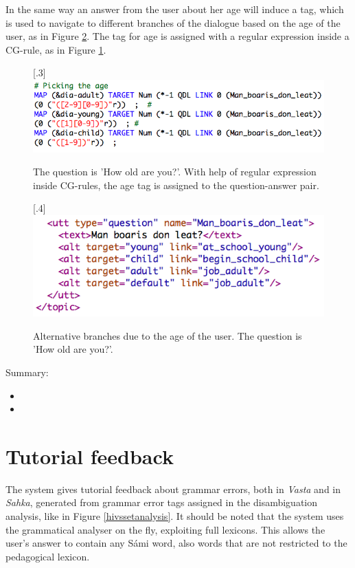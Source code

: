 \documentclass[11pt]{article}
\begin{document}
In the same way an answer from the user about her age will induce a tag, which is used to navigate to different branches of the dialogue based on the age of the user, as in Figure \ref{agebranches}. The tag for age is assigned with a regular expression inside a CG-rule, as in Figure \ref{agerule}.




\begin{figure}[htbp]
\begin{center}
\scalebox{.3}[.3]{\includegraphics{presentation/img/pickingage_colours.png}}\\
\caption{The question is 'How old are you?'. With help of regular expression inside CG-rules, the age tag is assigned to the question-answer pair.}
\label{agerule}
\end{center}
\end{figure}

\begin{figure}[htbp]
\begin{center}
\scalebox{.4}[.4]{\includegraphics{presentation/img/age_branching.png}}\\
\caption{Alternative branches due to the age of the user. The question is 'How old are you?'.}
\label{agebranches}
\end{center}
\end{figure}

Summary:
\begin{itemize}
\setlength{\itemsep}{-0.2cm}
\item 
\item 
\end{itemize}


\section{Tutorial feedback} \label{tutorial}
The system gives tutorial feedback about grammar errors, both in \textit{Vasta} and in \textit{Sahka}, generated from grammar error tags assigned in the disambiguation analysis, like in Figure \ref{hivssetanalysis}. It should be noted that the system uses the grammatical analyser on the fly, exploiting full lexicons. This allows the user's answer to contain any Sámi word, also words that are not restricted to the pedagogical lexicon.
\end{document}
